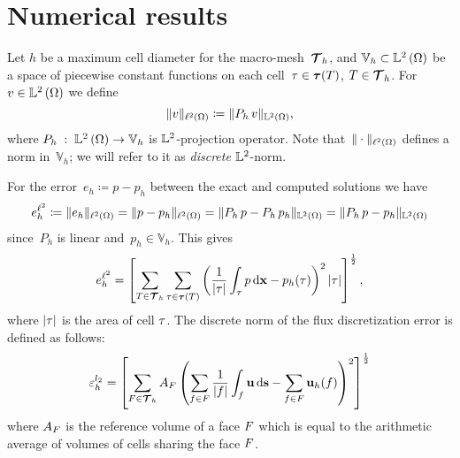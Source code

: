 \section{Numerical results}\label{sec:num}

Let $h$ be a maximum cell diameter for the macro-mesh~${\boldsymbol{\mathbf{\mathcal T}}}_h$, and $\mathbb V_h \subset {\mathbb L^2\left({\Omega}\right)}$ be a space of piecewise constant
functions on each cell~$\tau \in {\boldsymbol{\mathbf{\mathcal \tau}}}(T)$, $T \in {\boldsymbol{\mathbf{\mathcal T}}}_h$. For $v \in {\mathbb L^2\left({\Omega}\right)}$ we define
\begin{equation}\label{l2}
  \| v \|_{{\ell^2\left({\Omega}\right)}} \coloneqq \| P_h\,v \|_{{\mathbb L^2\left({\Omega}\right)}},
\end{equation}
where $P_h\;:\;{\mathbb L^2\left({\Omega}\right)}\rightarrow\mathbb V_h$ is ${\mathbb L^2}$-projection operator. Note that~$\| \cdot \|_{{\ell^2\left({\Omega}\right)}}$ defines a norm in~$\mathbb V_h$; we will refer to it as \textit{discrete} ${\mathbb L^2}$-norm.

For the error~$e_h \coloneqq p - p_h$ between the exact and computed solutions we have
\begin{equation}\label{l2norm}
	e^{{\ell^2}}_{h} \coloneqq \| e_h \|_{{\ell^2\left({\Omega}\right)}} = \| p - p_h \|_{{\ell^2\left({\Omega}\right)}} = \| P_h\,p - P_h\,p_h \|_{{\mathbb L^2\left({\Omega}\right)}} = \| P_h\,p - p_h \|_{{\mathbb L^2\left({\Omega}\right)}}
\end{equation}
since~$P_h$ is linear and~$p_h \in \mathbb V_h$. %
This gives
$$
	e^{{\ell^2}}_{h} = \left[\sum\limits_{T \in {\boldsymbol{\mathbf{\mathcal T}}}_h}\sum\limits_{\tau\in{\boldsymbol{\mathbf{\mathcal \tau}}}(T)} \left(\frac{1}{|\tau|}\int_{\tau} p \mathop{}\!\mathrm{d}{\boldsymbol{\mathbf{x}}} - p_h(\tau)\right)^2|\tau|\right]^\frac12,
$$
        where $|\tau|$ is the area of cell $\tau$. The discrete norm of the flux discretization error is defined as follows:
        $$
        \varepsilon_h^{l_2} =  \left[\sum\limits_{F \in {\boldsymbol{\mathbf{\mathcal T}}}_h}
          A_F\left(
          \sum\limits_{f\in F}
          \frac{1}{|f|}\int_{f}
          \boldsymbol{\mathbf{u}} \mathop{}\!\mathrm{d}{\boldsymbol{\mathbf{s}}}  - \sum\limits_{f\in F}\boldsymbol{\mathbf{u}}_h(f)\right)^2
          \right]^\frac12
        $$
        where $A_F$ is the reference volume of a face $F$ which is equal to the arithmetic average
of volumes of cells sharing the face $F$.

